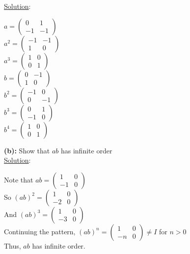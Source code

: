 \documentclass{article} %
\begin{document}
\underline{Solution}: 
\begin{addmargin}[1em]{0em}
$a = \left(\begin{matrix} 0 & 1 \\  -1 & -1 \end{matrix} \right)$
\\$a^2 = \left(\begin{matrix} -1 & -1 \\ 1 & 0 \end{matrix} \right)$
\\$a^3 = \left(\begin{matrix} 1 & 0 \\ 0 & 1 \end{matrix} \right)$
\\$b = \left( \begin{matrix} 0 & -1 \\ 1 & 0\end{matrix} \right)$
\\$b^2 = \left( \begin{matrix} -1 & 0 \\ 0 & -1\end{matrix} \right)$
\\$b^3 = \left( \begin{matrix} 0 & 1 \\ -1 & 0\end{matrix} \right)$
\\$b^4 = \left( \begin{matrix} 1 & 0 \\ 0 & 1\end{matrix} \right)$
\end{addmargin}    


\textbf{(b): }Show that $ab$ has infinite order
\\

\underline{Solution}:
\begin{addmargin}[1em]{0em}
Note that $ab = \left( \begin{matrix} 1 & 0 \\ -1 & 0\end{matrix}\right)$
\\So $(ab)^2 = \left( \begin{matrix} 1 & 0 \\ -2 & 0\end{matrix}\right)$
\\And $(ab)^3 = \left( \begin{matrix} 1 & 0 \\ -3 & 0\end{matrix}\right)$
\\Continuing the pattern, $(ab)^n = \left( \begin{matrix} 1 & 0 \\ -n & 0\end{matrix}\right) \neq I$ for $n > 0$
\\Thus, $ab$ has infinite order.
\end{addmargin}
\newpage
\end{document}
